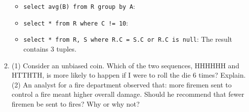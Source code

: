 \documentclass[11pt]{article}
\newcommand{\answer}[2]{\noindent {\bf Answer:} #2}
\renewcommand{\answer}[2]{\vspace{#1}}
\begin{document}
\begin{enumerate}
\begin{itemize}
\item {\tt select avg(B) from R group by A}:
\answer{.7in}{('a1', 15), ('a2', 15)}
\item {\tt select * from R where C != 10}:
\answer{.7in}{Second and third rows would be returned, but not the fourth}
\item {\tt select * from R, S where R.C = S.C or R.C is null}: The result contains 3 tuples.
\answer{1in}{('a2', 30, 30, 30, 'd1'), ('a2', 0, NULL, 30, 'd1'), ('a2', 0, NULL, NULL, 'd2')}
\end{itemize}



\item (1) Consider an unbiased coin. Which of the two sequences, HHHHHH and HTTHTH, is more likely to happen if I were to roll the die 6 times?
Explain. \\
(2) An analyst for a fire department observed that: more firemen sent to control a fire meant higher overall damage. Should he
recommend that fewer firemen be sent to fires? Why or why not?
            

\answer{2.8in}{ }

\end{enumerate}
\end{document}
